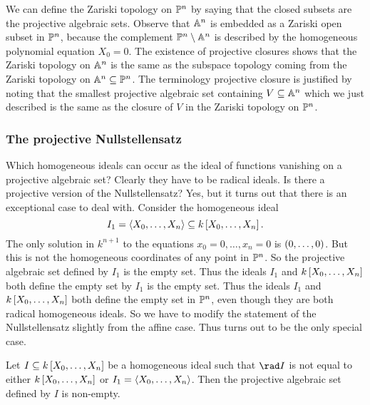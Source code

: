 We can define the Zariski topology on $ \PP^n $ by saying that the closed subsets are the projective algebraic sets. Observe that $ \AA^n $ is embedded as a Zariski open subset in $ \PP^n $, because the complement $ \PP^n \setminus \AA^n $ is described by the homogeneous polynomial equation $ X_0 = 0 $. The existence of projective closures shows that the Zariski topology on $ \AA^n $ is the same as the subspace topology coming from the Zariski topology on $ \AA^n \subseteq \PP^n $. The terminology projective closure is justified by noting that the smallest projective algebraic set containing $ V \subseteq \AA^n $ which we just described is the same as the closure of $ V $ in the Zariski topology on $ \PP^n $.

\subsubsection{The projective Nullstellensatz}


Which homogeneous ideals can occur as the ideal of functions vanishing on a projective algebraic set? Clearly they have to be radical ideals. Is there a projective version of the Nullstellensatz? Yes, but it turns out that there is an exceptional case to deal with. Consider the homogeneous ideal
$$ I_1 = \abr{X_0, \dots, X_n} \subseteq k\sbr{X_0, \dots, X_n}. $$
The only solution in $ k^{n + 1} $ to the equations $ x_0 = 0, \dots, x_n = 0 $ is $ \br{0, \dots, 0} $. But this is not the homogeneous coordinates of any point in $ \PP^n $. So the projective algebraic set defined by $ I_1 $ is the empty set. Thus the ideals $ I_1 $ and $ k\sbr{X_0, \dots, X_n} $ both define the empty set by $ I_1 $ is the empty set. Thus the ideals $ I_1 $ and $ k\sbr{X_0, \dots, X_n} $ both define the empty set in $ \PP^n $, even though they are both radical homogeneous ideals. So we have to modify the statement of the Nullstellensatz slightly from the affine case. Thus turns out to be the only special case.

\pagebreak

\begin{proposition}
Let $ I \subseteq k\sbr{X_0, \dots, X_n} $ be a homogeneous ideal such that $ \rad I $ is not equal to either $ k\sbr{X_0, \dots, X_n} $ or $ I_1 = \abr{X_0, \dots, X_n} $. Then the projective algebraic set defined by $ I $ is non-empty.
\end{proposition}

